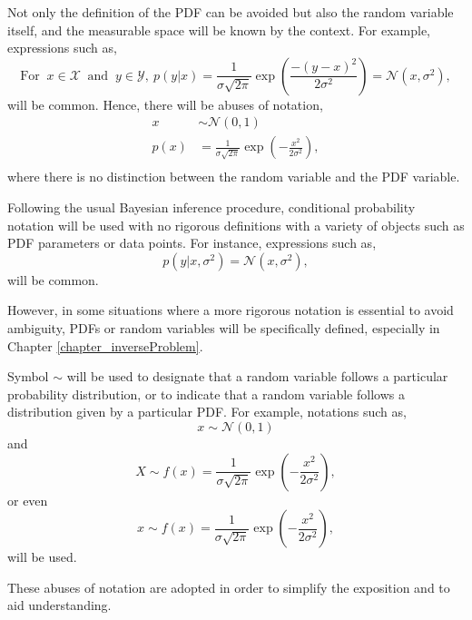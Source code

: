 Not only the definition of the PDF can be avoided but also the random variable itself, and the measurable space will be known by the context. For example, expressions such as,
\begin{equation*}
  \text{For } \ x \in \mathcal{X} \ \text{ and } \ y \in \mathcal{Y}, \ 
  p(y | x) = \frac{1}{\sigma\sqrt{2 \pi}}\exp \left( \frac{-(y-x)^2}{2\sigma^2} \right)
  = \mathcal{N}(x,\sigma^2),
\end{equation*}
will be common.
Hence, there will be abuses of notation,
$$
 \begin{aligned}
  x &\sim \mathcal{N}(0,1) \\
  p(x) &= \frac{1}{\sigma\sqrt{2 \pi}}\exp \left( -\frac{x^2}{2\sigma^2} \right), \\
 \end{aligned}
$$ 
where there is no distinction between the random variable and the PDF variable.

Following the usual Bayesian inference procedure, conditional probability notation will be used with no rigorous definitions with a variety of objects such as PDF parameters or data points. For instance, expressions such as,
\begin{equation*}
  p(y | x,\sigma^2) = \mathcal{N}(x,\sigma^2),
\end{equation*}
will be common.

However, in some situations where a more rigorous notation is essential to avoid ambiguity, PDFs or random variables will be specifically defined, especially in Chapter \ref{chapter_inverseProblem}. 

Symbol $\sim$ will be used to designate that a random variable follows a particular probability distribution, or to indicate that a random variable follows a distribution given by a particular PDF. 
For example, notations such as,
$$
  x \sim \mathcal{N}(0,1)
$$
and
$$
  X \sim f(x) = \frac{1}{\sigma\sqrt{2 \pi}}\exp \left( -\frac{x^2}{2\sigma^2} \right),
$$
or even
$$
  x \sim f(x) = \frac{1}{\sigma\sqrt{2 \pi}}\exp \left( -\frac{x^2}{2\sigma^2} \right),
$$
will be used.


These abuses of notation are adopted in order to simplify the exposition and to aid understanding.


